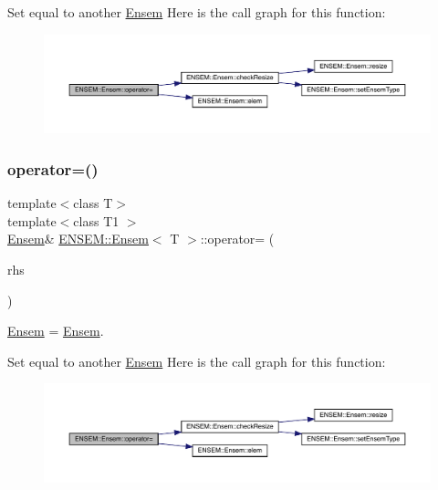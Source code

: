 Set equal to another \mbox{\hyperlink{classENSEM_1_1Ensem}{Ensem}} Here is the call graph for this function\+:
\nopagebreak
\begin{figure}[H]
\begin{center}
\leavevmode
\includegraphics[width=350pt]{d7/d3e/classENSEM_1_1Ensem_a83f34607867df5f1fb9ad887354de48d_cgraph}
\end{center}
\end{figure}
\mbox{\label{classENSEM_1_1Ensem_a83f34607867df5f1fb9ad887354de48d}} 
\subsubsection{\texorpdfstring{operator=()}{operator=()}\hspace{0.1cm}{\footnotesize\ttfamily [14/15]}}
{\footnotesize\ttfamily template$<$class T$>$ \\
template$<$class T1 $>$ \\
\mbox{\hyperlink{classENSEM_1_1Ensem}{Ensem}}\& \mbox{\hyperlink{classENSEM_1_1Ensem}{E\+N\+S\+E\+M\+::\+Ensem}}$<$ T $>$\+::operator= (\begin{DoxyParamCaption}\item[{const \mbox{\hyperlink{classENSEM_1_1Ensem}{Ensem}}$<$ T1 $>$ \&}]{rhs }\end{DoxyParamCaption})\hspace{0.3cm}{\ttfamily [inline]}}



\mbox{\hyperlink{classENSEM_1_1Ensem}{Ensem}} = \mbox{\hyperlink{classENSEM_1_1Ensem}{Ensem}}. 

Set equal to another \mbox{\hyperlink{classENSEM_1_1Ensem}{Ensem}} Here is the call graph for this function\+:
\nopagebreak
\begin{figure}[H]
\begin{center}
\leavevmode
\includegraphics[width=350pt]{d7/d3e/classENSEM_1_1Ensem_a83f34607867df5f1fb9ad887354de48d_cgraph}
\end{center}
\end{figure}
\mbox{\label{classENSEM_1_1Ensem_a83f34607867df5f1fb9ad887354de48d}} 
